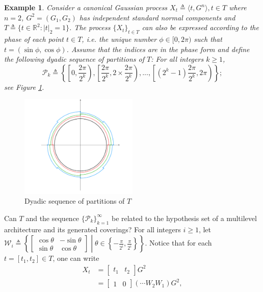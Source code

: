\documentclass{article}
\newtheorem{example}{Example}
\newcommand{\pa}{\mathcal{P}}
\begin{document}
\begin{example}\label{Gaussian linear net}
\normalfont 
Consider a canonical Gaussian process $X_t\triangleq \langle t,G^n\rangle, t\in T$ where $n=2$, $G^2=(G_1,G_2)$ has independent standard normal components and $T\triangleq\{t\in \mathbb{R}^2: | t |_2=1\}$. The process $\{X_t\}_{t\in T}$ can also be expressed according to the phase of each point $t\in T$, i.e. the unique number $\phi\in [0,2\pi)$ such that $t=(\sin \phi, \cos \phi)$. Assume that the indices are in the phase form and define the following dyadic sequence of partitions of $T$:
For all integers $k\geq 1$,
\begin{equation}\nonumber
	\pa_k\triangleq \left\{\left[0, \frac{2\pi}{2^{k}}\right), \left[\frac{2\pi}{2^{k}},2\times\frac{2\pi}{2^{k}}\right),..., \left[\left(2^{k}-1\right)\frac{2\pi}{2^{k}}, 2\pi\right)\right\};
\end{equation}
see Figure \ref{Partition_Gaussian}.
\end{example}
\begin{figure}
  \begin{center}
    \includegraphics[width=0.5\textwidth]{Figure_Gaussian.png}
  \end{center}
  \caption{Dyadic sequence of partitions of $T$}
  \label{Partition_Gaussian}
\end{figure}
Can $T$ and the sequence $\{\pa_k\}_{k=1}^{\infty}$ be related to the hypothesis set of a multilevel architecture and its generated coverings?
For all integers $i\geq 1$, let
$
	\mathcal{W}_i\triangleq \left\{
	\begin{bmatrix}
		\cos \theta &-\sin \theta\\
		\sin \theta & \cos \theta
	\end{bmatrix}\middle| \theta \in \left\{-\frac{\pi}{2	^i}, \frac{\pi}{2^i} \right\} \right\}.
$
Notice that for each $t=[t_1, t_2]\in T$, one can write 
\begin{align}
	X_t&=
	\begin{bmatrix}
t_1 & t_2	
\end{bmatrix}G^2
\nonumber\\
	 &=\begin{bmatrix}
1 & 0	
\end{bmatrix}
\left(\cdots W_2W_1 \right)G^2,\nonumber
\end{align}
\end{document}
